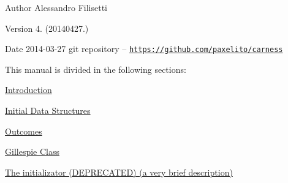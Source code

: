 \begin{DoxyAuthor}{Author}
Alessandro Filisetti 
\end{DoxyAuthor}
\begin{DoxyVersion}{Version}
4. (20140427.) 
\end{DoxyVersion}
\begin{DoxyDate}{Date}
2014-\/03-\/27 git repository -- \href{https://github.com/paxelito/carness}{\tt https\-://github.\-com/paxelito/carness}
\end{DoxyDate}
This manual is divided in the following sections\-:
\begin{DoxyItemize}
\item \hyperlink{intro}{Introduction}
\item \hyperlink{pageInitStr}{Initial Data Structures}
\item \hyperlink{pageoutcomes}{Outcomes}
\item \hyperlink{pageGillespie}{Gillespie Class}
\item \hyperlink{pageInitializator}{The initializator (D\-E\-P\-R\-E\-C\-A\-T\-E\-D) (a very brief description)} 
\end{DoxyItemize}